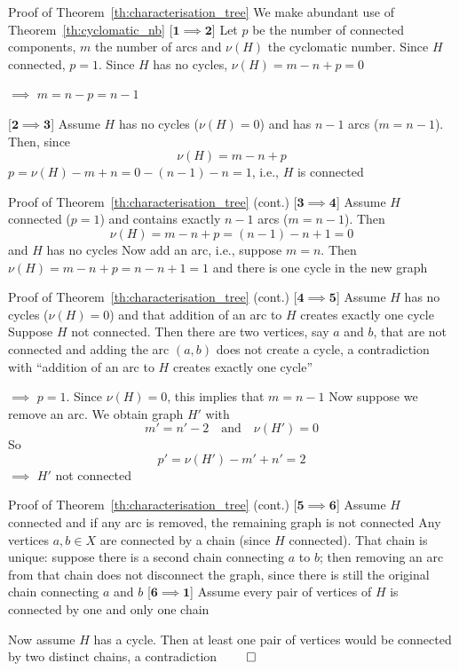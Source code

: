 \documentclass[aspectratio=169]{beamer}
\begin{document}
\begin{frame}{Proof of Theorem~\ref{th:characterisation_tree}}
We make abundant use of Theorem~\ref{th:cyclomatic_nb}
\vfill
[$\mathbf{1\implies 2}$] 
Let $p$ be the number of connected components, $m$ the number of arcs and $\nu(H)$ the cyclomatic number. Since $H$ connected, $p=1$. Since $H$ has no cycles, $\nu(H)=m-n+p=0$

$\implies$ $m=n-p=n-1$
\vfill

[$\mathbf{2\implies 3}$] 
Assume $H$ has no cycles ($\nu(H)=0$) and has $n-1$ arcs ($m=n-1$). Then, since
\[
\nu(H)=m-n+p
\]
$p=\nu(H)-m+n=0-(n-1)-n=1$, i.e., $H$ is connected
\end{frame}

\begin{frame}{Proof of Theorem~\ref{th:characterisation_tree} (cont.)}
[$\mathbf{3\implies 4}$]
Assume $H$ connected ($p=1$) and contains exactly $n-1$ arcs ($m=n-1$). Then
\[
\nu(H)=m-n+p=(n-1)-n+1=0
\]
and $H$ has no cycles
\vskip0.5cm
Now add an arc, i.e., suppose $m=n$. Then $\nu(H)=m-n+p=n-n+1=1$ and there is one cycle in the new graph
\end{frame}


\begin{frame}{Proof of Theorem~\ref{th:characterisation_tree} (cont.)}
[$\mathbf{4\implies 5}$]
Assume $H$ has no cycles ($\nu(H)=0$) and that addition of an arc to $H$ creates exactly one cycle
\vskip0.5cm
Suppose $H$ not connected. Then there are two vertices, say $a$ and $b$, that are not connected and adding the arc $(a,b)$ does not create a cycle, a contradiction with ``addition of an arc to $H$ creates exactly one cycle'' 

$\implies$ $p=1$. Since $\nu(H)=0$, this implies that $m=n-1$
\vskip0.5cm
Now suppose we remove an arc. We obtain graph $H'$ with
\[
m'=n'-2\quad\text{and}\quad \nu(H')=0
\]
So
\[
p'=\nu(H')-m'+n'=2
\]
$\implies$ $H'$ not connected
\end{frame}

\begin{frame}{Proof of Theorem~\ref{th:characterisation_tree} (cont.)}
[$\mathbf{5\implies 6}$]
Assume $H$ connected and if any arc is removed, the remaining graph is not connected
\vskip0.5cm
Any vertices $a,b\in X$ are connected by a chain (since $H$ connected). That chain is unique: suppose there is a second chain connecting $a$ to $b$; then removing an arc from that chain does not disconnect the graph, since there is still the original chain connecting $a$ and $b$
\vfill
[$\mathbf{6\implies 1}$]
Assume every pair of vertices of $H$ is connected by one and only one chain

Now assume $H$ has a cycle. Then at least one pair of vertices would be connected by two distinct chains, a contradiction
$\qed$
\end{frame}
\end{document}
